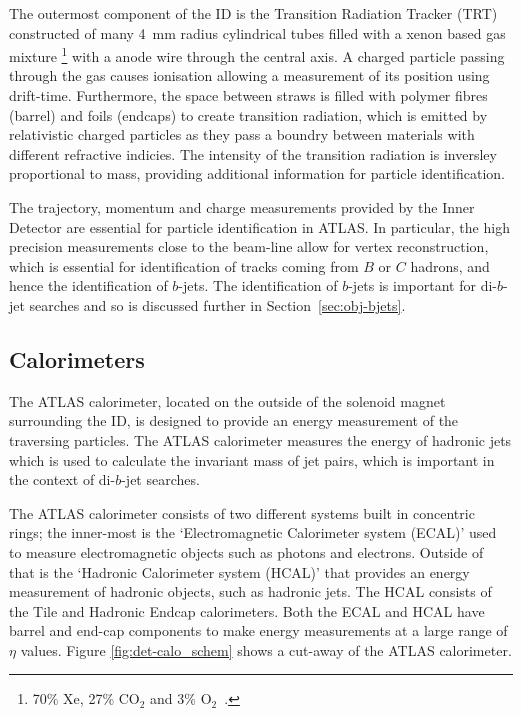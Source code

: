The outermost component of the ID is the Transition Radiation Tracker (TRT)
constructed of many \SI{4}{\mm} radius cylindrical tubes filled with a xenon based gas mixture
\footnote{ 70\% Xe, 27\% $\text{CO}_2$ and 3\% $\text{O}_2$~\cite{det-ID_xe}.}
with a anode wire through the central axis.
A charged particle passing through the gas causes ionisation allowing a measurement of its position using drift-time.
Furthermore, the space between straws is filled with polymer fibres (barrel) and foils (endcaps) to create transition radiation,
which is emitted by relativistic charged particles as they pass a boundry between materials with different refractive indicies.
The intensity of the transition radiation is inversley proportional to mass, providing additional information for particle identification. 

The trajectory, momentum and charge measurements provided by the Inner Detector are essential for particle identification in ATLAS.
In particular, the high precision measurements close to the beam-line allow for vertex reconstruction,
which is essential for identification of tracks coming from $B$ or $C$ hadrons, and hence the identification of $b$-jets.
The identification of $b$-jets is important for di-$b$-jet searches and so is discussed further in Section~\ref{sec:obj-bjets}.

\subsection{Calorimeters}
\label{sec:det-calo}

The ATLAS calorimeter, located on the outside of the solenoid magnet surrounding the ID,
is designed to provide an energy measurement of the traversing particles.
The ATLAS calorimeter measures the energy of hadronic jets which is used to calculate the invariant mass of jet pairs, %
which is important in the context of di-$b$-jet searches.

The ATLAS calorimeter consists of two different systems built in concentric rings;
the inner-most is the `Electromagnetic Calorimeter system (ECAL)' used to measure electromagnetic objects such as photons and electrons.
Outside of that is the `Hadronic Calorimeter system (HCAL)' that provides an energy measurement of hadronic objects, such as hadronic jets.
The HCAL consists of the Tile and Hadronic Endcap calorimeters.
Both the ECAL and HCAL have barrel and end-cap components to make energy measurements at a large range of $\eta$ values.
Figure \ref{fig:det-calo_schem} shows a cut-away of the ATLAS calorimeter.

